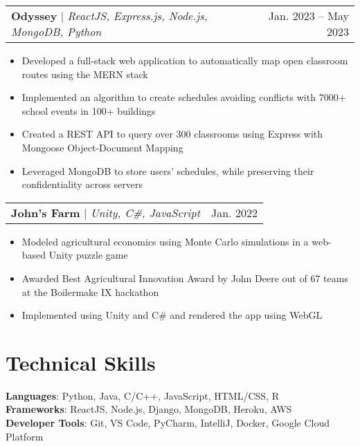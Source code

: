 \documentclass[letterpaper,11pt]{article}
\makeatletter
\newcommand{\resumeItem}[1]{
  \item\small{
    {#1 \vspace{-2pt}}
  }
}
\newcommand{\resumeProjectHeading}[2]{
    \item
    \begin{tabular*}{0.97\textwidth}{l@{\extracolsep{\fill}}r}
      \small#1 & #2 \\
    \end{tabular*}\vspace{-7pt}
}
\newcommand{\resumeSubHeadingListEnd}{\end{itemize}}
\newcommand{\resumeItemListStart}{\begin{itemize}}
\newcommand{\resumeItemListEnd}{\end{itemize}\vspace{-5pt}}
\makeatother
\begin{document}
        \resumeProjectHeading
          {\textbf{Odyssey} $|$ \emph{ReactJS, Express.js, Node.js, MongoDB, Python}}{Jan. 2023 -- May 2023}
          \resumeItemListStart
            \resumeItem{Developed a full-stack web application to automatically map open classroom routes using the MERN stack}
            \resumeItem{Implemented an algorithm to create schedules avoiding conflicts with 7000+ school events in 100+ buildings}
            \resumeItem{Created a REST API to query over 300 classrooms using Express with Mongoose Object-Document Mapping}
            \resumeItem{Leveraged MongoDB to store users' schedules, while preserving their confidentiality across servers}
          \resumeItemListEnd
          
        \resumeProjectHeading
          {\textbf{John's Farm} $|$ \emph{Unity, C\#, JavaScript}}{Jan. 2022}
          \resumeItemListStart
            \resumeItem{Modeled agricultural economics using Monte Carlo simulations in a web-based Unity puzzle game }
            \resumeItem{Awarded Best Agricultural Innovation Award by John Deere out of 67 teams at the Boilermake IX hackathon}
            \resumeItem{Implemented using Unity and C\# and rendered the app using WebGL}
          \resumeItemListEnd
          

\section{Technical Skills}
 \begin{itemize}[leftmargin=0.15in, label={}]
    \small{\item{
     \textbf{Languages}{: Python, Java, C/C++, JavaScript, HTML/CSS, R} \\
     \textbf{Frameworks}{: ReactJS, Node.js, Django, MongoDB, Heroku, AWS} \\
     \textbf{Developer Tools}{: Git, VS Code, PyCharm, IntelliJ, Docker, Google Cloud Platform} \\
    }}
 \end{itemize}
\end{document}
